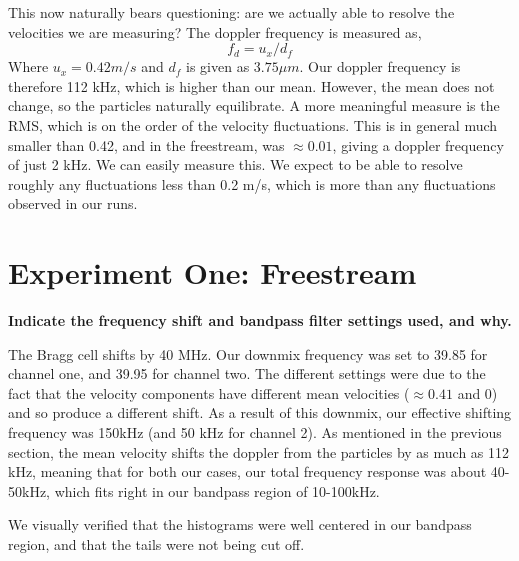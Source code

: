 \documentclass{article}
\begin{document}
This now naturally bears questioning: are we actually able to resolve the
velocities we are measuring? The doppler frequency is measured as,
\begin{equation}
 f_d = u_x / d_f 
\end{equation}
Where $u_x = 0.42 m/s$ and $d_f$ is given as $3.75 \mu m$. Our doppler
frequency is therefore 112 kHz, which is higher than our mean. However,
the mean does not change, so the particles naturally equilibrate. A more
meaningful measure is the RMS, which is on the order of the velocity
fluctuations. This is in general much smaller than 0.42, and in the
freestream, was $\approx 0.01$, giving a doppler frequency of just 2
kHz. We can easily measure this. We expect to be able to resolve roughly
any fluctuations less than 0.2 m/s, which is more than
any fluctuations observed in our runs. 



\section{Experiment One: Freestream}

\textbf{Indicate the frequency shift and bandpass filter settings used,
and why.} 

The Bragg cell shifts by 40 MHz. Our downmix frequency was set to 39.85
for channel one, and 39.95 for channel two. The different settings were
due to the fact that the velocity components have different mean
velocities ($\approx 0.41$ and 0) and so produce a different shift. As a
result of this downmix, our effective shifting frequency was 150kHz (and
50 kHz for channel 2). As mentioned in the previous section, the mean
velocity shifts the doppler from the particles by as much as 112 kHz,
meaning that for both our cases, our total 
frequency response was about 40-50kHz, which fits right in our
bandpass region of 10-100kHz.   

We visually verified that the histograms were well centered in our
bandpass region, and that the tails were not being cut off. 

\end{document}
